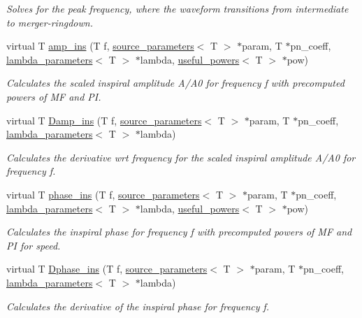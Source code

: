 \begin{DoxyCompactItemize}
\begin{DoxyCompactList}\small\item\em Solves for the peak frequency, where the waveform transitions from intermediate to merger-\/ringdown. \end{DoxyCompactList}\item 
virtual T \hyperlink{classIMRPhenomD_aef404dca66beb6652663271fee31b8f8}{amp\+\_\+ins} (T f, \hyperlink{structsource__parameters}{source\+\_\+parameters}$<$ T $>$ $\ast$param, T $\ast$pn\+\_\+coeff, \hyperlink{structlambda__parameters}{lambda\+\_\+parameters}$<$ T $>$ $\ast$lambda, \hyperlink{structuseful__powers}{useful\+\_\+powers}$<$ T $>$ $\ast$pow)
\begin{DoxyCompactList}\small\item\em Calculates the scaled inspiral amplitude A/\+A0 for frequency f with precomputed powers of MF and PI. \end{DoxyCompactList}\item 
virtual T \hyperlink{classIMRPhenomD_a7661208087c747ebfb04b59e17d66d17}{Damp\+\_\+ins} (T f, \hyperlink{structsource__parameters}{source\+\_\+parameters}$<$ T $>$ $\ast$param, T $\ast$pn\+\_\+coeff, \hyperlink{structlambda__parameters}{lambda\+\_\+parameters}$<$ T $>$ $\ast$lambda)
\begin{DoxyCompactList}\small\item\em Calculates the derivative wrt frequency for the scaled inspiral amplitude A/\+A0 for frequency f. \end{DoxyCompactList}\item 
virtual T \hyperlink{classIMRPhenomD_a7073ff2be22b0251ca419d0b69dd9990}{phase\+\_\+ins} (T f, \hyperlink{structsource__parameters}{source\+\_\+parameters}$<$ T $>$ $\ast$param, T $\ast$pn\+\_\+coeff, \hyperlink{structlambda__parameters}{lambda\+\_\+parameters}$<$ T $>$ $\ast$lambda, \hyperlink{structuseful__powers}{useful\+\_\+powers}$<$ T $>$ $\ast$pow)
\begin{DoxyCompactList}\small\item\em Calculates the inspiral phase for frequency f with precomputed powers of MF and PI for speed. \end{DoxyCompactList}\item 
virtual T \hyperlink{classIMRPhenomD_ab840b052576cde8a9e802c5784d24092}{Dphase\+\_\+ins} (T f, \hyperlink{structsource__parameters}{source\+\_\+parameters}$<$ T $>$ $\ast$param, T $\ast$pn\+\_\+coeff, \hyperlink{structlambda__parameters}{lambda\+\_\+parameters}$<$ T $>$ $\ast$lambda)
\begin{DoxyCompactList}\small\item\em Calculates the derivative of the inspiral phase for frequency f. \end{DoxyCompactList}\item 

\end{DoxyCompactItemize}
